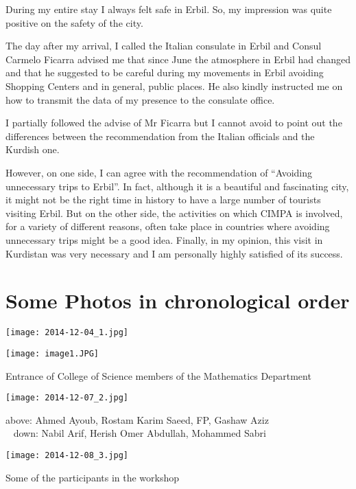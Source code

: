 \documentclass[12pt,a4paper]{scrartcl}
\begin{document}
During my entire stay I always felt safe in Erbil. So, my impression was quite positive on the safety of the city.

The day after my arrival, I called the Italian consulate in Erbil and Consul Carmelo Ficarra advised me that
since June the atmosphere in Erbil had changed and that he suggested to be careful during my movements in Erbil avoiding Shopping Centers
and in general, public places. He also kindly instructed me on how to transmit the data of my presence to the consulate office.

I partially followed the advise of Mr Ficarra but I cannot avoid to point out the differences between 
the recommendation from the Italian officials and the Kurdish one.

However, on one side, I can agree with the recommendation of ``Avoiding unnecessary trips to Erbil''. In fact, although it is a beautiful
and fascinating city, it might not be the right time in history to have a large number of tourists visiting Erbil. 
But on the other side, the activities on which CIMPA is involved, for a variety of different reasons, often take place in countries 
where avoiding unnecessary trips might be a good idea. Finally, in my opinion, this visit in Kurdistan was very necessary and I am personally highly satisfied of
its success.



 \section{Some Photos in chronological order}
 
 
 
 \texttt{[image: 2014-12-04\_1.jpg]}\hspace{.6cm}\begin{minipage}[t]{9cm}
 \texttt{[image: image1.JPG]}
                                           \end{minipage}
                                          
 \small{\hspace*{.50cm} Entrance of College of Science\hspace{3.6cm} members of the Mathematics Department}\bigskip
% 

\centerline{\texttt{[image: 2014-12-07\_2.jpg]}}

 \small{\hspace{3.6cm} above: Ahmed Ayoub, Rostam Karim Saeed, FP, Gashaw Aziz\\
 \ \hspace*{3.6cm} down: Nabil Arif, Herish Omer Abdullah, Mohammed Sabri}
 
\pagebreak

\centerline{\texttt{[image: 2014-12-08\_3.jpg]}}

 \small{\hspace{6cm} Some of the participants in the workshop}
\end{document}
